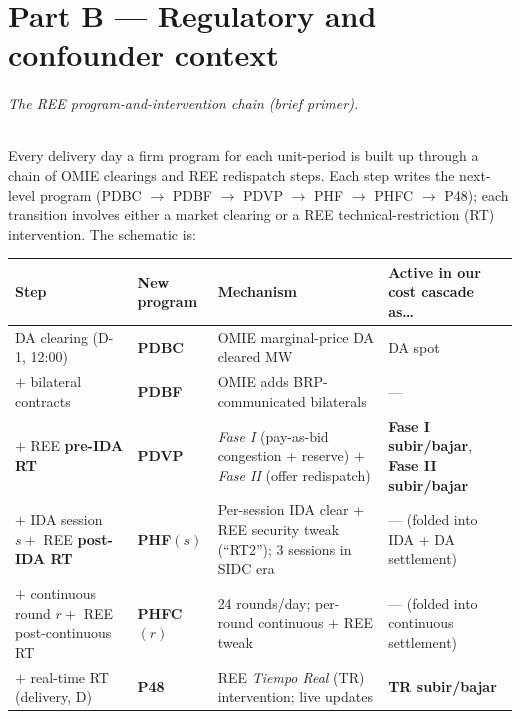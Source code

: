 \documentclass[11pt,a4paper]{article}
\begin{document}
\part{Part B --- Regulatory and confounder context}

\paragraph{The REE program-and-intervention chain (brief primer).} Every delivery day a firm program for each unit-period is built up through a chain of OMIE clearings and REE redispatch steps. Each step writes the next-level program (PDBC $\to$ PDBF $\to$ PDVP $\to$ PHF $\to$ PHFC $\to$ P48); each transition involves either a market clearing or a REE technical-restriction (RT) intervention. The schematic is:

\begin{center}\scriptsize
\setlength{\tabcolsep}{4pt}
\begin{tabular}{l l l l}
\toprule
Step & New program & Mechanism & Active in our cost cascade as\ldots \\
\midrule
DA clearing (D-1, 12:00) & \textbf{PDBC} & OMIE marginal-price DA cleared MW & DA spot \\
\quad $+$ bilateral contracts & \textbf{PDBF} & OMIE adds BRP-communicated bilaterals & --- \\
\quad $+$ REE \textbf{pre-IDA RT} & \textbf{PDVP} & \emph{Fase I} (pay-as-bid congestion + reserve) $+$ \emph{Fase II} (offer redispatch) & \textbf{Fase I subir/bajar}, \textbf{Fase II subir/bajar} \\
\quad $+$ IDA session $s + $ REE \textbf{post-IDA RT} & \textbf{PHF}$(s)$ & Per-session IDA clear + REE security tweak (``RT2''); 3 sessions in SIDC era & --- (folded into IDA + DA settlement) \\
\quad $+$ continuous round $r + $ REE post-continuous RT & \textbf{PHFC}$(r)$ & 24 rounds/day; per-round continuous + REE tweak & --- (folded into continuous settlement) \\
\quad $+$ real-time RT (delivery, D) & \textbf{P48} & REE \emph{Tiempo Real} (TR) intervention; live updates & \textbf{TR subir/bajar} \\
\bottomrule
\end{tabular}
\end{center}
\end{document}
